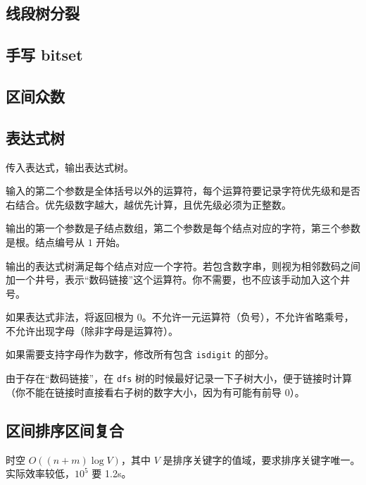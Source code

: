 \documentclass[12pt]{ctexart}
\begin{document}


\subsection{线段树分裂}



\subsection{手写 bitset}



\subsection{区间众数}



\subsection{表达式树}

传入表达式，输出表达式树。

输入的第二个参数是全体括号以外的运算符，每个运算符要记录字符优先级和是否右结合。优先级数字越大，越优先计算，且优先级必须为正整数。

输出的第一个参数是子结点数组，第二个参数是每个结点对应的字符，第三个参数是根。结点编号从 $1$ 开始。

输出的表达式树满足每个结点对应一个字符。若包含数字串，则视为相邻数码之间加一个井号，表示“数码链接”这个运算符。你不需要，也不应该手动加入这个井号。

如果表达式非法，将返回根为 $0$。不允许一元运算符（负号），不允许省略乘号，不允许出现字母（除非字母是运算符）。

如果需要支持字母作为数字，修改所有包含 \verb|isdigit| 的部分。

由于存在“数码链接”，在 \verb|dfs| 树的时候最好记录一下子树大小，便于链接时计算（你不能在链接时直接看右子树的数字大小，因为有可能有前导 $0$）。



\subsection{区间排序区间复合}

时空 $O((n+m)\log V)$，其中 $V$ 是排序关键字的值域，要求排序关键字唯一。实际效率较低，$10^5$ 要 1.2s。
\end{document}
